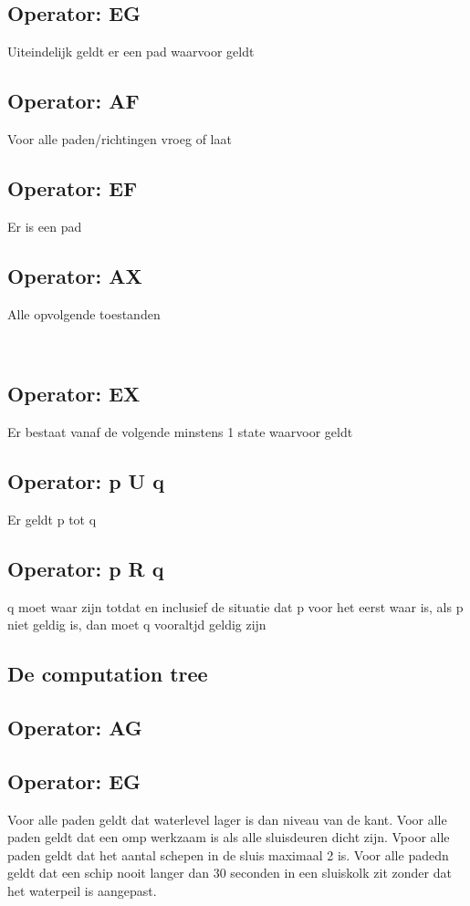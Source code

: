  
 \subsection{Operator: EG}
 Uiteindelijk geldt er een pad waarvoor geldt
 
 \subsection{Operator: AF}
 Voor alle paden/richtingen vroeg of laat
 \subsection{Operator: EF}
 Er is een pad
 \subsection{Operator: AX}
 Alle opvolgende toestanden
 
 ~\cite{locke_2020}
 \subsection{Operator: EX}
 Er bestaat vanaf de volgende minstens 1 state waarvoor geldt
 \subsection{Operator: p U q}
 Er geldt p tot q
 ~\cite{gnsguides}
 \subsection{Operator: p R q}
 q moet waar zijn totdat en inclusief de situatie dat p voor het eerst waar is, als p niet geldig is, dan moet q vooraltjd geldig zijn
 
 
 \subsection{De computation tree}
 
 \subsection{Operator: AG}
 
 \subsection{Operator: EG}
 
 
 Voor alle paden geldt dat waterlevel lager is dan niveau van de kant.
 Voor alle paden geldt dat een omp werkzaam is als alle sluisdeuren dicht zijn.
 Vpoor alle paden geldt dat het aantal schepen in de sluis maximaal 2 is.
 Voor alle padedn  geldt dat een schip nooit langer dan 30 seconden in een sluiskolk zit zonder dat het waterpeil is aangepast.
